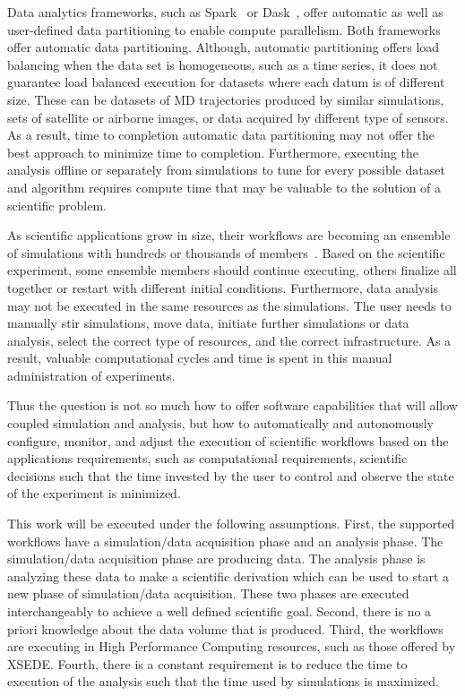 Data analytics frameworks, such as Spark~\cite{zaharia2010spark} or Dask~\cite{rocklin2015dask}, offer automatic as well as user-defined data partitioning to enable compute parallelism. Both frameworks offer automatic data partitioning. Although, automatic partitioning offers load balancing when the data set is homogeneous, such as a time series, it does not guarantee load balanced execution for datasets where each datum is of different size. These can be datasets of MD trajectories produced by similar simulations, sets of satellite or airborne images, or data acquired by different type of sensors. As a result, time to completion automatic data partitioning may not offer the best approach to minimize time to completion. Furthermore, executing the analysis offline or separately from simulations to tune for every possible dataset and algorithm requires compute time that may be valuable to the solution of a scientific problem.

As scientific applications grow in size, their workflows are becoming an ensemble of simulations with hundreds or thousands of members~\cite{malawski2015algorithms,rietmann2012forward}. Based on the scientific experiment, some ensemble members should continue executing, others finalize all together or restart with different initial conditions. Furthermore, data analysis may not be executed in the same resources as the simulations. The user needs to manually stir simulations, move data, initiate further simulations or data analysis, select the correct type of resources, and the correct infrastructure. As a result, valuable computational cycles and time is spent in this manual administration of 
experiments.


Thus the question is not so much how to offer software capabilities that will allow coupled simulation and analysis, but how to automatically and autonomously configure, monitor, and adjust the execution of scientific workflows based on the applications requirements, such as computational requirements, scientific decisions such that the time invested by the user to control and observe the state of the experiment is minimized.

This work will be executed under the following assumptions. First, the supported workflows have a simulation/data acquisition phase and an analysis phase. The simulation/data acquisition phase are producing data. The analysis phase is analyzing these data to make a scientific derivation which can be used to start a new phase of simulation/data acquisition. These two phases are executed interchangeably to achieve a well defined scientific goal. Second, there is no a priori knowledge about the data volume that is produced. Third, the workflows are executing in High Performance Computing resources, such as those offered by XSEDE. Fourth, there is a constant requirement is to reduce the time to execution of the analysis such that the time used by simulations is maximized.

